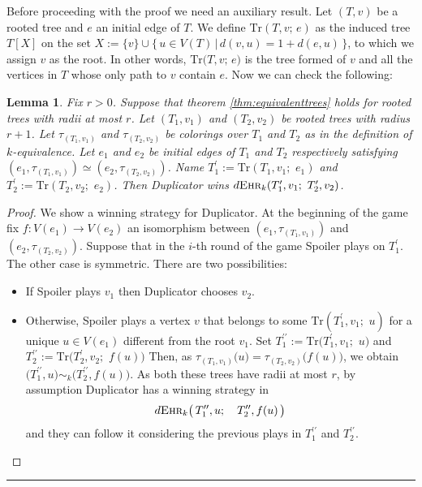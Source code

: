 \documentclass[12pt,notitlepage,a4paper]{article}
\newtheorem{lemma}{Lemma}[section]
\theoremstyle{definition}
\newcommand{\ehr}{\textsc{Ehr}}
\begin{document}
Before proceeding with the proof we need an auxiliary
result. Let $(T,v)$ be a rooted tree and $e$ an 
initial edge of $T$. We define $\mathrm{Tr}(T,v;\, e)$ as
the induced tree $T[X]$ on the set
$X:=\{v\} \cup \{\, u\in V(T) \, | \, d(v,u) = 1 + d(e,u) \,\}$,
to which we assign $v$ as the root. In other words, 
$\mathrm{Tr}\big(T,v;\, e\big)$ is the tree formed of 
$v$ and all the vertices
in $T$ whose only path to $v$ contain $e$. 
Now we can check the following:

\begin{lemma} \label{lem:equivalentedges}
	Fix $r>0$. Suppose that theorem \ref{thm:equivalenttrees}
	holds for rooted trees with radii at most $r$.
	Let $(T_1,v_1)$ and $(T_2,v_2)$ be rooted trees with radius
	$r+1$. Let $\tau_{(T_1,v_1)}$ and $\tau_{(T_2,v_2)}$
	be colorings over $T_1$ and $T_2$ as in the
	definition of $k$-equivalence. 
	Let $e_1$ and $e_2$ be initial edges 
	of $T_1$ and $T_2$ respectively satisfying 
	$(e_1,\tau_{(T_1,v_1)})\simeq (e_2,\tau_{(T_2,v_2)})$. Name 
	$T^\prime_1:=\mathrm{Tr}(T_1,v_1; \,\,e_1)$ and 
	$T^\prime_2:=\mathrm{Tr}(T_2,v_2;\,\,e_2)$. Then
	Duplicator wins 
	$d\ehr_{k}(T^\prime_1, v_1; \, \, T^\prime_2,v_2)$.
\end{lemma}
\begin{proof}
	We show a winning strategy for Duplicator.
	At the beginning of the game fix 
	$f:V(e_1)\rightarrow V(e_2)$ an isomorphism between 
	$(e_1,\tau_{(T_1,v_1)})$
	and $(e_2,\tau_{(T_2,v_2)})$.
	Suppose that in the $i$-th round of the game Spoiler
	plays on $T^\prime_1$. The other case is symmetric. 
	There are two possibilities:
	\begin{itemize}
		\item If Spoiler plays $v_1$ 
		then Duplicator chooses $v_2$. 
		\item Otherwise, Spoiler plays a vertex $v$ that belongs
		to some $\mathrm{Tr}(T^\prime_1,v_1;\,\, u)$ for a unique $u\in V(e_1)$
		different from the root $v_1$. 
		Set $T^{\prime\prime}_1:=
		\mathrm{Tr}\big(T^\prime_1,v_1;\,\, u\big)$
		and
		$T^{\prime\prime}_2:=\mathrm{Tr}\big(T^\prime_2,v_2;\,\, f(u)\big)$
		Then, as $\tau_{(T_1,v_1)}\big(u\big)=\tau_{(T_2,v_2)}\big(f(u)\big)$,
		we obtain
		$\big(T^{\prime\prime}_1,u\big) \sim_k 
		\big(T^{\prime \prime}_2,f(u)\big)$.
		As both these trees have radii at most $r$, 
		by assumption Duplicator has a winning 
		strategy in \[
		d\ehr_{k}\big(\,T^{\prime\prime}_1, u;
		\quad T^{\prime \prime}_2, f(u)\,  \big)
		\]
		and they can follow it considering the previous plays in
		$T^{\prime\prime}_1$ and $T^{\prime\prime}_2$.	
	\end{itemize}
\end{proof}
\noindent\rule{2cm}{0.4pt}
\end{document}
